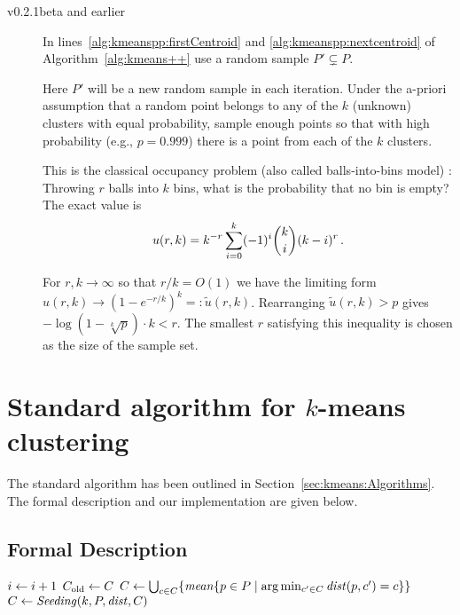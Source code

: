 \begin{description}
	\item[v0.2.1beta and earlier] In lines~\ref{alg:kmeanspp:firstCentroid} and \ref{alg:kmeanspp:nextcentroid} of Algorithm~\ref{alg:kmeans++} use a random sample $P' \subsetneq P$.

		Here $P'$ will be a new random sample in each iteration. Under the a-priori assumption that a random point belongs to any of the $k$ (unknown) clusters with equal probability, sample enough points so that with high probability (e.g., $p = 0.999$) there is a point from each of the $k$ clusters.

		This is the classical occupancy problem (also called balls-into-bins model) \cite{F68a}: Throwing $r$ balls into $k$ bins, what is the probability that no bin is empty? The exact value is
		\begin{align*}
			u(r, k) = k^{-r} \sum_{i=0}^k (-1)^i \binom ki (k - i)^r
			\SiM.
		\end{align*}

		For $r,k \to \infty$ so that $r/k = O(1)$ we have the limiting form $u(r,k) \to (1 - e^{-r/k})^k =: \widetilde u(r, k)$. Rearranging $\widetilde u(r, k) > p$ gives $-\log(1 - \sqrt[k]p) \cdot k < r$. The smallest $r$ satisfying this inequality is chosen as the size of the sample set.
\end{description}

\section[Standard algorithm for k-means clustering]{Standard algorithm for $k$-means clustering}

The standard algorithm has been outlined in Section~\ref{sec:kmeans:Algorithms}. The formal description and our implementation are given below.

\subsection{Formal Description}

\begin{algorithm} \label{alg:kmeans}
\begin{algorithmic}[1]
	\Repeat
		\State $i \leftarrow i + 1$
		\State $C_\text{old} \leftarrow C$
		\State $C \leftarrow \bigcup_{c \in C} \{ \mathit{mean} \{p \in P \mid \arg\min_{c' \in C} \mathit{dist}(p, c') = c \} \}$ \label{alg:kmeans:MoveCentroids}
		\State $C \leftarrow \mathit{Seeding}(k, P, \mathit{dist}, C)$ \label{alg:kmeans:Reseed} 
	 \label{alg:kmeans:ConvergenceCond}
\end{algorithmic}
\end{algorithm}

